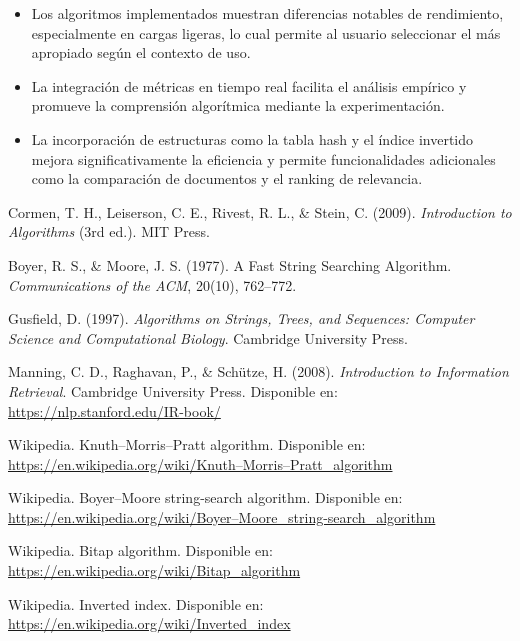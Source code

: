 \documentclass[9pt,letterpaper,onecolumn]{rho-class/rho}
\begin{document}
\begin{itemize}
    \item Los algoritmos implementados muestran diferencias notables de rendimiento, especialmente en cargas ligeras, lo cual permite al usuario seleccionar el más apropiado según el contexto de uso.
    \item La integración de métricas en tiempo real facilita el análisis empírico y promueve la comprensión algorítmica mediante la experimentación.
    \item La incorporación de estructuras como la tabla hash y el índice invertido mejora significativamente la eficiencia y permite funcionalidades adicionales como la comparación de documentos y el ranking de relevancia.
\end{itemize}

\begin{thebibliography}{9}

Cormen, T. H., Leiserson, C. E., Rivest, R. L., \& Stein, C. (2009).
\textit{Introduction to Algorithms} (3rd ed.).
MIT Press.

Boyer, R. S., \& Moore, J. S. (1977).
A Fast String Searching Algorithm.
\textit{Communications of the ACM}, 20(10), 762–772.

Gusfield, D. (1997).
\textit{Algorithms on Strings, Trees, and Sequences: Computer Science and Computational Biology}.
Cambridge University Press.

Manning, C. D., Raghavan, P., \& Schütze, H. (2008).
\textit{Introduction to Information Retrieval}.
Cambridge University Press. Disponible en: \url{https://nlp.stanford.edu/IR-book/}

Wikipedia. Knuth–Morris–Pratt algorithm. Disponible en: \url{https://en.wikipedia.org/wiki/Knuth–Morris–Pratt_algorithm}

Wikipedia. Boyer–Moore string-search algorithm. Disponible en: \url{https://en.wikipedia.org/wiki/Boyer–Moore_string-search_algorithm}

Wikipedia. Bitap algorithm. Disponible en: \url{https://en.wikipedia.org/wiki/Bitap_algorithm}

Wikipedia. Inverted index. Disponible en: \url{https://en.wikipedia.org/wiki/Inverted_index}

\end{thebibliography}
\end{document}
